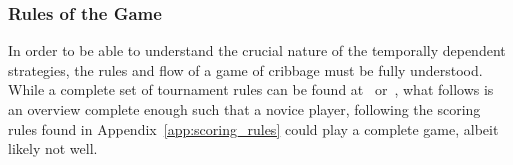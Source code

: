 
\subsubsection{Rules of the Game}

In order to be able to understand the crucial nature of the temporally dependent
strategies, the rules and flow of a game of cribbage must be fully understood.
%
While a complete set of tournament rules can be found at~\cite{ACC_rules}
or~\cite{ACC_rulebook},
what follows is an overview complete enough such that a novice player,
following the scoring rules found in Appendix~\ref{app:scoring_rules}
could play a complete game, albeit likely not well.

